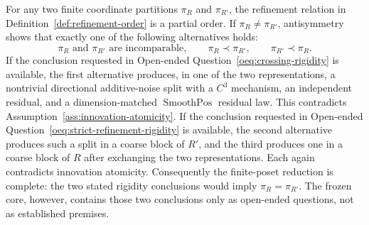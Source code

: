 For any two finite coordinate partitions \(\pi_R\) and \(\pi_{R'}\), the
refinement relation in Definition~\ref{def:refinement-order} is a partial
order.  If \(\pi_R\ne\pi_{R'}\), antisymmetry shows that exactly one of the
following alternatives holds:
\[
 \pi_R\text{ and }\pi_{R'}\text{ are incomparable},\qquad
 \pi_R\prec\pi_{R'},\qquad
 \pi_{R'}\prec\pi_R.
\]
If the conclusion requested in Open-ended
Question~\ref{oeq:crossing-rigidity} is available, the first alternative
produces, in one of the two representations, a nontrivial directional
additive-noise split with a \(C^3\) mechanism, an independent residual, and a
dimension-matched \(\operatorname{SmoothPos}\) residual law.  This contradicts
Assumption~\ref{ass:innovation-atomicity}.  If the conclusion requested in
Open-ended Question~\ref{oeq:strict-refinement-rigidity} is available, the
second alternative produces such a split in a coarse block of \(R'\), and
the third produces one in a coarse block of \(R\) after exchanging the two
representations.  Each again contradicts innovation atomicity.  Consequently
the finite-poset reduction is complete: the two stated rigidity conclusions
would imply \(\pi_R=\pi_{R'}\).  The frozen core, however, contains those two
conclusions only as open-ended questions, not as established premises.